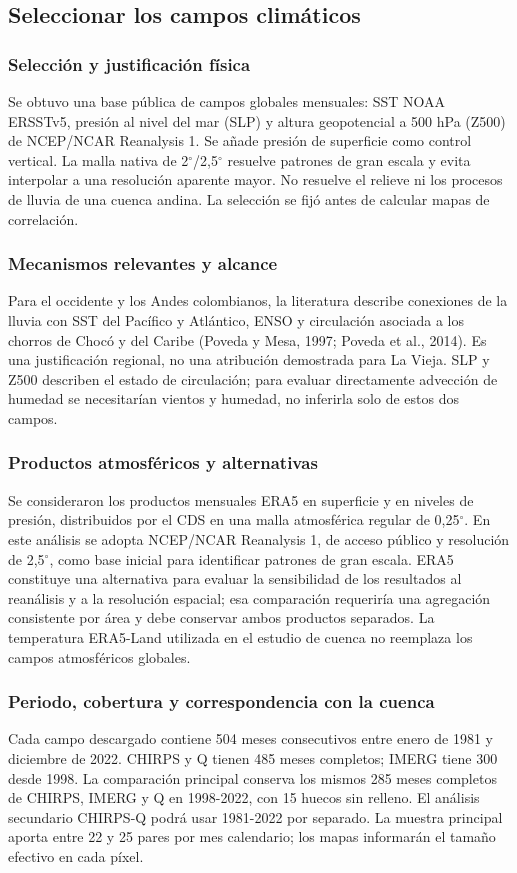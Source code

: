 \subsection{Seleccionar los campos climáticos}
\subsubsection*{Selección y justificación física}
Se obtuvo una base pública de campos globales mensuales: SST NOAA ERSSTv5, presión al nivel del mar (SLP) y altura geopotencial a 500 hPa (Z500) de NCEP/NCAR Reanalysis 1. Se añade presión de superficie como control vertical. La malla nativa de 2$^\circ$/2,5$^\circ$ resuelve patrones de gran escala y evita interpolar a una resolución aparente mayor. No resuelve el relieve ni los procesos de lluvia de una cuenca andina. La selección se fijó antes de calcular mapas de correlación.

\subsubsection*{Mecanismos relevantes y alcance}
Para el occidente y los Andes colombianos, la literatura describe conexiones de la lluvia con SST del Pacífico y Atlántico, ENSO y circulación asociada a los chorros de Chocó y del Caribe (Poveda y Mesa, 1997; Poveda et al., 2014). Es una justificación regional, no una atribución demostrada para La Vieja. SLP y Z500 describen el estado de circulación; para evaluar directamente advección de humedad se necesitarían vientos y humedad, no inferirla solo de estos dos campos.

\subsubsection*{Productos atmosféricos y alternativas}
Se consideraron los productos mensuales ERA5 en superficie y en niveles de presión, distribuidos por el CDS en una malla atmosférica regular de 0,25$^\circ$. En este análisis se adopta NCEP/NCAR Reanalysis 1, de acceso público y resolución de 2,5$^\circ$, como base inicial para identificar patrones de gran escala. ERA5 constituye una alternativa para evaluar la sensibilidad de los resultados al reanálisis y a la resolución espacial; esa comparación requeriría una agregación consistente por área y debe conservar ambos productos separados. La temperatura ERA5-Land utilizada en el estudio de cuenca no reemplaza los campos atmosféricos globales.

\subsubsection*{Periodo, cobertura y correspondencia con la cuenca}
Cada campo descargado contiene 504 meses consecutivos entre enero de 1981 y diciembre de 2022. CHIRPS y Q tienen 485 meses completos; IMERG tiene 300 desde 1998. La comparación principal conserva los mismos 285 meses completos de CHIRPS, IMERG y Q en 1998-2022, con 15 huecos sin relleno. El análisis secundario CHIRPS-Q podrá usar 1981-2022 por separado. La muestra principal aporta entre 22 y 25 pares por mes calendario; los mapas informarán el tamaño efectivo en cada píxel.

